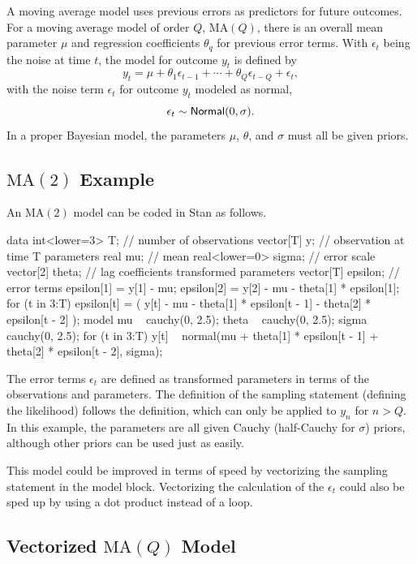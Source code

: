 A moving average model uses previous errors as predictors for future
outcomes.  For a moving average model of order $Q$, $\mbox{MA}(Q)$,
there is an overall mean parameter $\mu$ and regression coefficients
$\theta_q$ for previous error terms.  With $\epsilon_t$ being the
noise at time $t$, the model for outcome $y_t$ is defined by
\[
y_t = \mu + \theta_1 \epsilon_{t-1} + \cdots + \theta_Q \epsilon_{t-Q}
+ \epsilon_t,
\]
with the noise term $\epsilon_t$ for outcome $y_t$ modeled as
normal,
\[
\epsilon_t \sim \mbox{\sf Normal}(0,\sigma).
\]
In a proper Bayesian model, the parameters $\mu$, $\theta$, and
$\sigma$ must all be given priors.

\subsection{$\mbox{MA}(2)$ Example}

An $\mbox{MA}(2)$ model can be coded in Stan as follows.
%
\begin{stancode}
data {
  int<lower=3> T;  // number of observations
  vector[T] y;     // observation at time T
}
parameters {
  real mu;              // mean
  real<lower=0> sigma;  // error scale
  vector[2] theta;      // lag coefficients
}
transformed parameters {
  vector[T] epsilon;    // error terms
  epsilon[1] = y[1] - mu;
  epsilon[2] = y[2] - mu - theta[1] * epsilon[1];
  for (t in 3:T)
    epsilon[t] = ( y[t] - mu
                    - theta[1] * epsilon[t - 1]
                    - theta[2] * epsilon[t - 2] );
}
model {
  mu ~ cauchy(0, 2.5);
  theta ~ cauchy(0, 2.5);
  sigma ~ cauchy(0, 2.5);
  for (t in 3:T)
    y[t] ~ normal(mu
                  + theta[1] * epsilon[t - 1]
                  + theta[2] * epsilon[t - 2],
                  sigma);
}
\end{stancode}
%
The error terms $\epsilon_t$ are defined as transformed parameters in
terms of the observations and parameters.  The definition of the
sampling statement (defining the likelihood) follows the definition,
which can only be applied to $y_n$ for $n > Q$.  In this example, the
parameters are all given Cauchy (half-Cauchy for $\sigma$) priors,
although other priors can be used just as easily.

This model could be improved in terms of speed by vectorizing the
sampling statement in the model block.  Vectorizing the calculation of
the $\epsilon_t$ could also be sped up by using a dot product instead
of a loop.


\subsection{Vectorized $\mbox{MA}(Q)$ Model}

